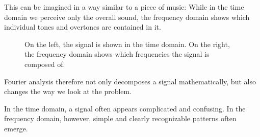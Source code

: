 This can be imagined in a way similar to a piece of music:
While in the time domain we perceive only the overall sound,
the frequency domain shows
which individual tones and overtones are contained in it.
\newpage
\noindent
\FloatBarrier
\begin{figure}[H]
	\centering
	\caption{
		On the left, the signal is shown in the time domain.
		On the right, the frequency domain shows
		which frequencies the signal is composed of.
	}
	\label{fig:zeit-frequenzbereich}
\end{figure}

Fourier analysis therefore not only decomposes a signal mathematically,
but also changes the way we look at the problem.

In the time domain, a signal often appears complicated and confusing.
In the frequency domain, however, simple and clearly recognizable patterns often emerge.

